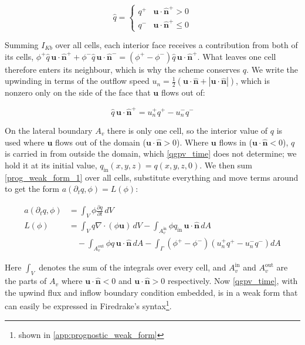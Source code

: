 \documentclass{article}
\begin{document}
\begin{equation}\label{upwind_flux}
    \hat q =
    \begin{cases}
        q^+ & \bm u \cdot \bm{\hat n}^+ > 0 \\
        q^- & \bm u \cdot \bm{\hat n}^+ \leq 0
    \end{cases}
\end{equation}

Summing $I_{Kb}$ over all cells, each interior face receives a contribution from both of its cells, $\phi^+ \hat q\, \bm u \cdot \bm{\hat n}^+ + \phi^- \hat q\, \bm u \cdot \bm{\hat n}^- = (\phi^+ - \phi^-) \hat q\, \bm u \cdot \bm{\hat n}^+$.
What leaves one cell therefore enters its neighbour, which is why the scheme conserves $q$.
We write the upwinding in terms of the outflow speed $u_n = \frac{1}{2} \left( \bm u \cdot \bm{\hat n} + \left| \bm u \cdot \bm{\hat n}\right| \right)$, which is nonzero only on the side of the face that $\bm u$ flows out of:

\begin{equation}\label{upwind_flux_un}
    \hat q\, \bm u \cdot \bm{\hat n}^+ = u_n^+ q^+ - u_n^- q^-
\end{equation}

On the lateral boundary $A_v$ there is only one cell, so the interior value of $q$ is used where $\bm u$ flows out of the domain ($\bm u \cdot \bm{\hat n} > 0$).
Where $\bm u$ flows in ($\bm u \cdot \bm{\hat n} < 0$), $q$ is carried in from outside the domain, which \cref{qgpv_time} does not determine; we hold it at its initial value, $q_\text{in}(x,y,z) = q(x,y,z,0)$.
We then sum \cref{prog_weak_form_1} over all cells, substitute everything and move terms around to get the form $a(\partial_t q,\phi) = L(\phi)$:

\begin{equation}\label{prog_final_weak_form}
\begin{aligned}
    a(\partial_t q, \phi) &= \int_V {\phi \frac{\partial q}{\partial t} \,dV} \\
    L(\phi) &= \int_V {q \nabla \cdot \left( \phi \bm u \right) \,dV} - \int_{A_v^\text{in}} {\phi q_\text{in}\, \bm u \cdot \bm{\hat n} \,dA} \\
    &\quad - \int_{A_v^\text{out}} {\phi q\, \bm u \cdot \bm{\hat n} \,dA} - \int_\Gamma {\left( \phi^+ - \phi^- \right) \left( u_n^+ q^+ - u_n^- q^- \right) dA}
\end{aligned}
\end{equation}

Here $\int_V$ denotes the sum of the integrals over every cell, and $A_v^\text{in}$ and $A_v^\text{out}$ are the parts of $A_v$ where $\bm u \cdot \bm{\hat n} < 0$ and $\bm u \cdot \bm{\hat n} > 0$ respectively.
Now \cref{qgpv_time}, with the upwind flux and inflow boundary condition embedded, is in a weak form that can easily be expressed in Firedrake's syntax\footnote{shown in \cref{app:prognostic_weak_form}}.
\end{document}
